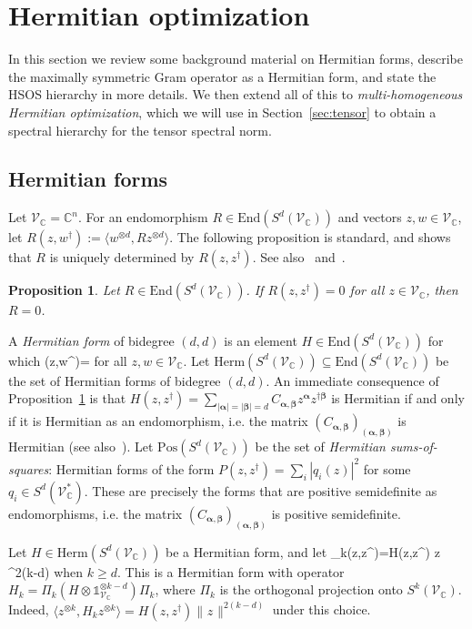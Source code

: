 \documentclass[11pt]{article}
\numberwithin{theorem}{section}
\newtheorem{prop}[theorem]{Proposition}
\theoremstyle{definition}
\newcommand{\tinyspace}{\mspace{1mu}}
\newcommand{\ip}[2]{\langle #1 , #2\rangle}
\newcommand{\norm}[1]{\lVert\tinyspace #1 \tinyspace\rVert}
\newcommand{\I}{\mathds{1}}
\newcommand{\setft}[1]{\mathrm{#1}}
\newcommand{\Pos}{\setft{Pos}}
\newcommand{\Herm}{\setft{Herm}}
\newcommand{\complex}{\mathbb{C}}
\newcommand\V{\mathcal{V}}
\newcommand{\End}{\setft{End}}
\newcommand{\dg}{\dagger}
\newcommand{\bfalpha}{\boldsymbol{\alpha}}
\newcommand{\bfbeta}{\boldsymbol{\beta}}
\renewcommand{\over}[1]{\overline{#1}}
\def\ba#1\ea{\begin{align}#1\end{align}}
\newcommand{\Vc}{\V_{\complex}}
\begin{document}
\section{Hermitian optimization}\label{sec:herm}

In this section we review some background material on Hermitian forms, describe the maximally symmetric Gram operator as a Hermitian form, and state the HSOS hierarchy in more details. We then extend all of this to \textit{multi-homogeneous Hermitian optimization}, which we will use in Section~\ref{sec:tensor} to obtain a spectral hierarchy for the tensor spectral norm.

\subsection{Hermitian forms}
Let $\Vc=\complex^n$. For an endomorphism $R \in \End(S^d(\Vc))$ and vectors $z,w \in \Vc$, let $R(z,w^\dg):= \ip{w^{\otimes d}}{R z^{\otimes d}}$. The following proposition is standard, and shows that $R$ is uniquely determined by $R(z,z^\dg)$. See also~\cite{d2011hermitian,d2019hermitian} and~\cite[Proposition 7.1]{DJLV24}.
\begin{prop}\label{prop:polarization}
Let $R \in \End(S^d(\Vc))$. If $R(z,z^\dg)=0$ for all $z \in \Vc$, then $R=0$.
\end{prop}
A \textit{Hermitian form} of bidegree $(d,d)$ is an element $H \in \End(S^d(\Vc))$ for which 
\ba
H(z,w^\dg)=\over{H(w,z^\dg)}
\ea
for all $z,w\in \Vc$. Let $\Herm(S^d(\Vc))\subseteq \End(S^d(\Vc))$ be the set of Hermitian forms of bidegree $(d,d)$. An immediate consequence of Proposition~\ref{prop:polarization} is that $H(z,z^\dg)=\sum_{|\bfalpha|=|\bfbeta|=d} C_{\bfalpha,\bfbeta} z^{\bfalpha} z^{\dg \bfbeta}$ is Hermitian if and only if it is Hermitian as an endomorphism, i.e. the matrix $(C_{\bfalpha,\bfbeta})_{(\bfalpha,\bfbeta)}$ is Hermitian (see also~\cite[Proposition 1.1]{d2011hermitian}). Let $\Pos(S^{d}(\Vc))$ be the set of \textit{Hermitian sums-of-squares}: Hermitian forms of the form $P(z,z^\dg)=\sum_{i} |q_i(z)|^2$ for some $q_i \in S^{d}(\Vc^*)$. These are precisely the forms that are positive semidefinite as endomorphisms, i.e. the matrix $(C_{\bfalpha,\bfbeta})_{(\bfalpha,\bfbeta)}$ is positive semidefinite.

Let $H \in \Herm(S^d(\Vc))$ be a Hermitian form, and let
\ba
H_k(z,z^\dg)=H(z,z^\dg) \norm{z}^{2(k-d)}
\ea
when $k \geq d$. This is a Hermitian form with operator $H_k=\Pi_k(H\otimes \I_{\Vc}^{\otimes k-d})\Pi_k$, where $\Pi_k$ is the orthogonal projection onto $S^k(\Vc)$. Indeed, $\ip{z^{\otimes k}}{H_k z^{\otimes k}}=H(z,z^\dg)\norm{z}^{2(k-d)}$ under this choice.
\end{document}
